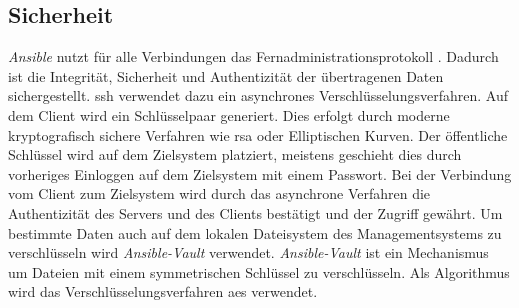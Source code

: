 \documentclass[titlepage]{report}
\begin{document}
\subsection*{Sicherheit}
\emph{Ansible} nutzt für alle Verbindungen das
Fernadministrationsprotokoll . Dadurch ist die Integrität,
Sicherheit und Authentizität der übertragenen Daten sichergestellt.
\gls{ssh} verwendet dazu ein asynchrones Verschlüsselungsverfahren. Auf
dem Client wird ein Schlüsselpaar generiert. Dies erfolgt durch moderne
kryptografisch sichere Verfahren wie \gls{rsa} oder Elliptischen Kurven.
Der öffentliche Schlüssel wird auf dem Zielsystem platziert, meistens
geschieht dies durch vorheriges Einloggen auf dem Zielsystem mit einem
Passwort. Bei der Verbindung vom Client zum Zielsystem wird durch das
asynchrone Verfahren die Authentizität des Servers und des Clients
bestätigt und der Zugriff gewährt. Um bestimmte Daten auch auf dem
lokalen Dateisystem des Managementsystems zu verschlüsseln wird
\emph{Ansible\hyp{}Vault} verwendet. \emph{Ansible\hyp{}Vault} ist ein
Mechanismus um Dateien mit einem symmetrischen Schlüssel zu
verschlüsseln. Als Algorithmus wird das Verschlüsselungsverfahren
\gls{aes} verwendet\cite{ANSIBLEVAULT}.
\end{document}
